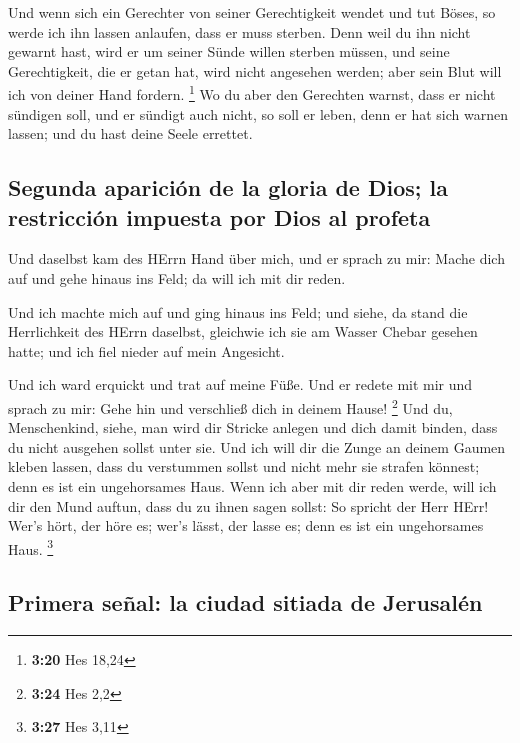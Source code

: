  Und wenn sich ein Gerechter von seiner Gerechtigkeit
wendet und tut Böses, so werde ich ihn lassen anlaufen, dass er muss
sterben. Denn weil du ihn nicht gewarnt hast, wird er um seiner Sünde
willen sterben müssen, und seine Gerechtigkeit, die er getan hat, wird
nicht angesehen werden; aber sein Blut will ich von deiner Hand fordern.
\footnote{\textbf{3:20} Hes 18,24}  Wo du aber den
Gerechten warnst, dass er nicht sündigen soll, und er sündigt auch
nicht, so soll er leben, denn er hat sich warnen lassen; und du hast
deine Seele errettet.

\hypertarget{segunda-apariciuxf3n-de-la-gloria-de-dios-la-restricciuxf3n-impuesta-por-dios-al-profeta}{%
\subsection{Segunda aparición de la gloria de Dios; la restricción
impuesta por Dios al
profeta}\label{segunda-apariciuxf3n-de-la-gloria-de-dios-la-restricciuxf3n-impuesta-por-dios-al-profeta}}

 Und daselbst kam des HErrn Hand über mich, und er sprach
zu mir: Mache dich auf und gehe hinaus ins Feld; da will ich mit dir
reden.

 Und ich machte mich auf und ging hinaus ins Feld; und
siehe, da stand die Herrlichkeit des HErrn daselbst, gleichwie ich sie
am Wasser Chebar gesehen hatte; und ich fiel nieder auf mein Angesicht.

 Und ich ward erquickt und trat auf meine Füße. Und er
redete mit mir und sprach zu mir: Gehe hin und verschließ dich in deinem
Hause! \footnote{\textbf{3:24} Hes 2,2}  Und du,
Menschenkind, siehe, man wird dir Stricke anlegen und dich damit binden,
dass du nicht ausgehen sollst unter sie.  Und ich will
dir die Zunge an deinem Gaumen kleben lassen, dass du verstummen sollst
und nicht mehr sie strafen könnest; denn es ist ein ungehorsames Haus.
 Wenn ich aber mit dir reden werde, will ich dir den Mund
auftun, dass du zu ihnen sagen sollst: So spricht der Herr HErr! Wer's
hört, der höre es; wer's lässt, der lasse es; denn es ist ein
ungehorsames Haus. \footnote{\textbf{3:27} Hes 3,11}

\hypertarget{primera-seuxf1al-la-ciudad-sitiada-de-jerusaluxe9n}{%
\subsection{Primera señal: la ciudad sitiada de
Jerusalén}\label{primera-seuxf1al-la-ciudad-sitiada-de-jerusaluxe9n}}

